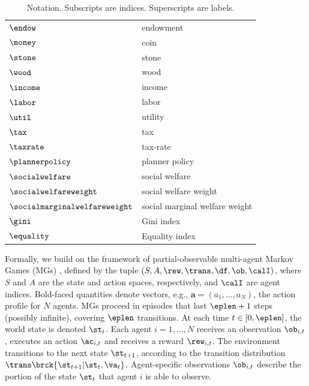 \begin{table}[h!]
\begin{minipage}[t]{0.48\linewidth}
\begin{small}
\begin{center}
\begin{tabular}[c]{ll}
                    $\endow$ & endowment \\
                    $\money$ & coin \\
                    $\stone$ & stone \\
                    $\wood$ & wood \\
                    \hline
                    $\income$ & income \\
                    $\labor$ & labor \\
                    $\util$ & utility \\
                    \hline
                    $\tax$ & tax \\
                    $\taxrate$ & tax-rate \\
                    \hline
                    $\plannerpolicy$ & planner policy \\
                    $\socialwelfare$  & social welfare \\
                    $\socialwelfareweight$  & social welfare weight \\
                    $\socialmarginalwelfareweight$  & social marginal welfare weight \\
                    \hline
                    $\gini$ & Gini index \\
                    $\equality$ & Equality index \\
                \end{tabular}
                \label{tab:notation_econ}
            \end{center}
        \end{small}
    \end{minipage}
    \caption{Notation. Subscripts are indices. Superscripts are labels.    \label{tab:notation}}
\end{table}




Formally, we build on the framework of partial-observable multi-agent Markov Games (MGs) \citep{sutton2018reinforcement}, defined by the tuple $(S, A, \rew, \trans, \df, \ob, \calI)$, where $S$ and $A$ are the state and action spaces, respectively, and $\calI$ are agent indices.
Bold-faced quantities denote vectors, e.g., $\bm{a}=(a_1,\ldots,a_N)$, the action profile for $N$ agents.
MGs proceed in episodes that last $\eplen + 1$ steps (possibly infinite), covering $\eplen$ transitions.
At each time $t \in [0,\eplen]$, the world state is denoted $\st_t$. Each agent $i = 1,\ldots,N$ receives an observation $\ob_{i,t}$, executes an action $\ac_{i,t}$ and receives a reward $\rew_{i,t}$.
The environment transitions to the next state $\st_{t+1}$, according to the transition distribution $\trans\brck{\st_{t+1} | \st_t, \va_t }$.
Agent-specific observations $\ob_{i, t}$ describe the portion of the state $\st_t$ that agent $i$ is able to observe.

